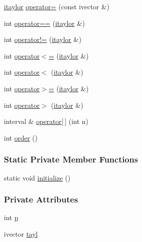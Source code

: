 \begin{DoxyCompactItemize}
\item 
\hyperlink{classtaylor_1_1itaylor}{itaylor} \hyperlink{classtaylor_1_1itaylor_a3e9c0bf41e486a5c9c95f107ceba0b7c}{operator=} (const ivector \&)
\item 
int \hyperlink{classtaylor_1_1itaylor_ab0651bb54b7671f3443d3f939fbe2510}{operator==} (\hyperlink{classtaylor_1_1itaylor}{itaylor} \&)
\item 
int \hyperlink{classtaylor_1_1itaylor_aa7041b3ebe493a059d6dfaee28faf82c}{operator!=} (\hyperlink{classtaylor_1_1itaylor}{itaylor} \&)
\item 
int \hyperlink{classtaylor_1_1itaylor_a7b823770abba6bdcf6c2091caee5381d}{operator$<$=} (\hyperlink{classtaylor_1_1itaylor}{itaylor} \&)
\item 
int \hyperlink{classtaylor_1_1itaylor_a5f4eaaa8772c9146900a951b8e53e2c6}{operator$<$} (\hyperlink{classtaylor_1_1itaylor}{itaylor} \&)
\item 
int \hyperlink{classtaylor_1_1itaylor_acaf2ba4e4dcb012aed6a469a30ad5682}{operator$>$=} (\hyperlink{classtaylor_1_1itaylor}{itaylor} \&)
\item 
int \hyperlink{classtaylor_1_1itaylor_a47ca76c8135b9bd62998e85c427fb232}{operator$>$} (\hyperlink{classtaylor_1_1itaylor}{itaylor} \&)
\item 
interval \& \hyperlink{classtaylor_1_1itaylor_a3674126b2d14cc05e23c7150b52d0a8f}{operator\mbox{[}$\,$\mbox{]}} (int n)
\item 
int \hyperlink{classtaylor_1_1itaylor_a8a1dadee94ddf7f4c48757c02a696996}{order} ()
\end{DoxyCompactItemize}
\subsubsection*{\-Static \-Private \-Member \-Functions}
\begin{DoxyCompactItemize}
\item 
static void \hyperlink{classtaylor_1_1itaylor_ab017f8633627f482ed1f3cc405d62d36}{initialize} ()
\end{DoxyCompactItemize}
\subsubsection*{\-Private \-Attributes}
\begin{DoxyCompactItemize}
\item 
int \hyperlink{classtaylor_1_1itaylor_a4039cb1a204543dce7b572839609c890}{p}
\item 
ivector \hyperlink{classtaylor_1_1itaylor_a4df835280789a8639aed81fe83b272f8}{tayl}
\end{DoxyCompactItemize}
